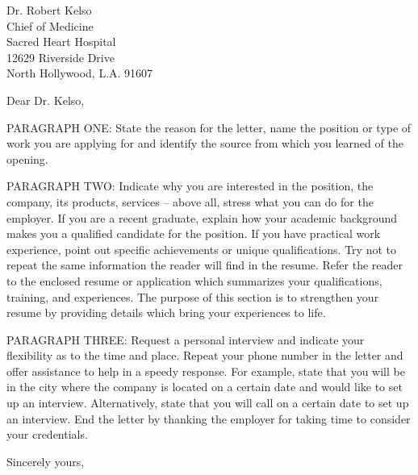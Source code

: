 \documentclass[
	parskip=half, %
	enlargefirstpage=true, %
]{scrlttr2} %
\begin{document}

\begin{letter}{
	Dr. Robert Kelso \\
	Chief of Medicine \\
	Sacred Heart Hospital \\
	12629 Riverside Drive \\
	North Hollywood, L.A. 91607
}

\opening{Dear Dr. Kelso,}

PARAGRAPH ONE: State the reason for the letter, name the position or type of work you are applying for and identify the source from which you learned of the opening.

PARAGRAPH TWO: Indicate why you are interested in the position, the company, its products, services -- above all, stress what you can do for the employer. If you are a recent graduate, explain how your academic background makes you a qualified candidate for the position. If you have practical work experience, point out specific achievements or unique qualifications. Try not to repeat the same information the reader will find in the resume. Refer the reader to the enclosed resume or application which summarizes your qualifications, training, and experiences. The purpose of this section is to strengthen your resume by providing details which bring your experiences to life.

PARAGRAPH THREE: Request a personal interview and indicate your flexibility as to the time and place. Repeat your phone number in the letter and offer assistance to help in a speedy response. For example, state that you will be in the city where the company is located on a certain date and would like to set up an interview. Alternatively, state that you will call on a certain date to set up an interview. End the letter by thanking the employer for taking time to consider your credentials.

Sincerely yours, \\


\end{letter}
\end{document}
